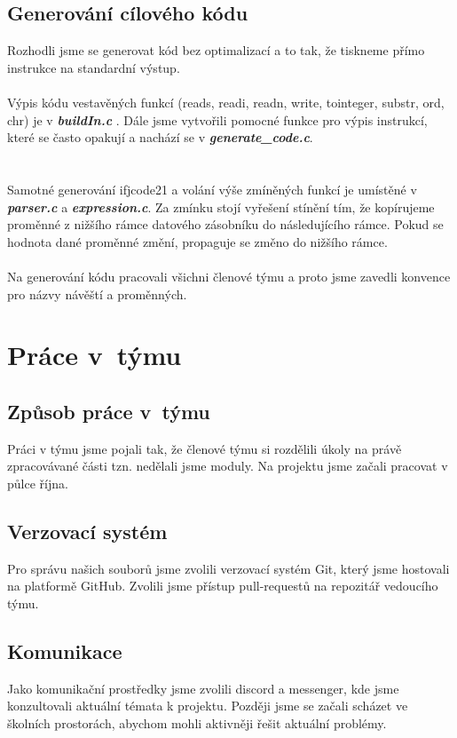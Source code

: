 \documentclass[12pt, letterpaper]{article}
\begin{document}
	\subsection{Generování cílového kódu}
	Rozhodli jsme se generovat kód bez optimalizací a to tak, že tiskneme přímo instrukce na standardní výstup.\\\\
    Výpis kódu vestavěných funkcí (reads, readi, readn, write, tointeger, substr, ord, chr) je v \textbf{\textit{buildIn.c}} . Dále jsme vytvořili pomocné funkce pro výpis instrukcí, které se často opakují a nachází se v \textbf{\textit{generate\_code.c}}.\\\\
    \\
    \newpage
    Samotné generování ifjcode21 a volání výše zmíněných funkcí je umístěné v \textbf{\textit{parser.c}} a \textbf{\textit{expression.c}}. Za zmínku stojí vyřešení stínění tím, že kopírujeme proměnné z nižšího rámce datového zásobníku do následujícího rámce. Pokud se hodnota dané proměnné změní, propaguje se změno do nižšího rámce. \\\\
    Na generování kódu pracovali všichni členové týmu a proto jsme zavedli konvence pro názvy návěští a proměnných. 
	\section{Práce v~týmu}

	\subsection{Způsob práce v~týmu}
    
    \large
    Práci v týmu jsme pojali tak, že členové týmu si rozdělili úkoly na právě zpracovávané části tzn. nedělali jsme moduly. Na projektu jsme začali pracovat v půlce října.
    
	\subsection{Verzovací systém}
    
    \large
    Pro správu našich souborů jsme zvolili verzovací systém Git, který jsme hostovali na platformě GitHub. Zvolili jsme přístup pull-requestů na repozitář vedoucího týmu.
    
	\subsection{Komunikace}
	\large
	Jako komunikační prostředky jsme zvolili discord a messenger, kde jsme konzultovali aktuální témata k projektu. Později jsme se začali scházet ve školních prostorách, abychom mohli aktivněji řešit aktuální problémy. 
\end{document}
